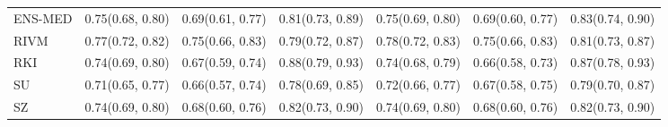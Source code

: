 \begin{tabular}{l p{} p{} p{} p{} p{} p{}}
ENS-MED & {0.75\newline(0.68, 0.80)} & {0.69\newline(0.61, 0.77)} & {0.81\newline(0.73, 0.89)} & {0.75\newline(0.69, 0.80)} & {0.69\newline(0.60, 0.77)} & {0.83\newline(0.74, 0.90)} \\
RIVM & {0.77\newline(0.72, 0.82)} & {0.75\newline(0.66, 0.83)} & {0.79\newline(0.72, 0.87)} & {0.78\newline(0.72, 0.83)} & {0.75\newline(0.66, 0.83)} & {0.81\newline(0.73, 0.87)} \\
RKI & {0.74\newline(0.69, 0.80)} & {0.67\newline(0.59, 0.74)} & {0.88\newline(0.79, 0.93)} & {0.74\newline(0.68, 0.79)} & {0.66\newline(0.58, 0.73)} & {0.87\newline(0.78, 0.93)} \\
SU & {0.71\newline(0.65, 0.77)} & {0.66\newline(0.57, 0.74)} & {0.78\newline(0.69, 0.85)} & {0.72\newline(0.66, 0.77)} & {0.67\newline(0.58, 0.75)} & {0.79\newline(0.70, 0.87)} \\
SZ & {0.74\newline(0.69, 0.80)} & {0.68\newline(0.60, 0.76)} & {0.82\newline(0.73, 0.90)} & {0.74\newline(0.69, 0.80)} & {0.68\newline(0.60, 0.76)} & {0.82\newline(0.73, 0.90)} \\
\bottomrule
\end{tabular}
